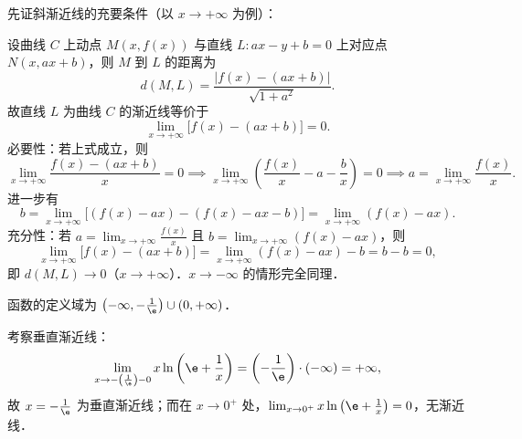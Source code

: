 \begin{solution}
    先证斜渐近线的充要条件（以 $x \to +\infty$ 为例）：

    设曲线 $C$ 上动点 $M(x, f(x))$ 与直线 $L: ax - y + b = 0$ 上对应点 $N(x, ax+b)$，则 $M$ 到 $L$ 的距离为
    \begin{equation}
        d(M, L) = \frac{|f(x) - (ax + b)|}{\sqrt{1 + a^2}}.
    \end{equation}
    故直线 $L$ 为曲线 $C$ 的渐近线等价于
    \begin{equation}
        \lim_{x\to +\infty} \bigl[ f(x) - (ax + b) \bigr] = 0.
    \end{equation}
    必要性：若上式成立，则
    \begin{equation}
        \lim_{x\to +\infty} \frac{f(x) - (ax + b)}{x} = 0 \implies \lim_{x\to +\infty} \left( \frac{f(x)}{x} - a - \frac{b}{x} \right) = 0 \implies a = \lim_{x\to +\infty} \frac{f(x)}{x}.
    \end{equation}
    进一步有
    \begin{equation}
        b = \lim_{x\to +\infty} \bigl[ (f(x) - ax) - (f(x) - ax - b) \bigr] = \lim_{x\to +\infty} (f(x) - ax).
    \end{equation}
    充分性：若 $a = \lim_{x\to +\infty} \frac{f(x)}{x}$ 且 $b = \lim_{x\to +\infty} (f(x) - ax)$，则
    \begin{equation}
        \lim_{x\to +\infty} \bigl[ f(x) - (ax + b) \bigr] = \lim_{x\to +\infty} (f(x) - ax) - b = b - b = 0,
    \end{equation}
    即 $d(M, L) \to 0$（$x \to +\infty$）．$x \to -\infty$ 的情形完全同理．


    函数的定义域为 $\left( -\infty, -\frac{1}{\e} \right) \cup (0, +\infty)$．

    考察垂直渐近线：
    \begin{equation}
        \lim_{x\to -\left(\frac{1}{\e}\right)-0} x\ln\left( \e + \frac{1}{x} \right) = \left( -\frac{1}{\e} \right) \cdot (-\infty) = +\infty,
    \end{equation}
    故 $x = -\frac{1}{\e}$ 为垂直渐近线；而在 $x \to 0^+$ 处，$\lim_{x\to 0^+} x\ln\left(\e + \frac{1}{x}\right) = 0$，无渐近线．


\end{solution}
